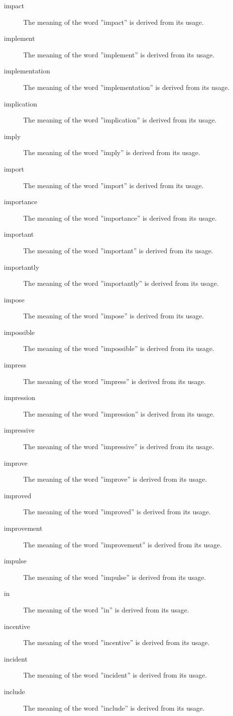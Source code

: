 \documentclass[12pt, letterpaper]{memoir}
\begin{document}
\begin{description}
\item[impact] The meaning of the word ''impact'' is derived from its usage.
\item[implement] The meaning of the word ''implement'' is derived from its usage.
\item[implementation] The meaning of the word ''implementation'' is derived from its usage.
\item[implication] The meaning of the word ''implication'' is derived from its usage.
\item[imply] The meaning of the word ''imply'' is derived from its usage.
\item[import] The meaning of the word ''import'' is derived from its usage.
\item[importance] The meaning of the word ''importance'' is derived from its usage.
\item[important] The meaning of the word ''important'' is derived from its usage.
\item[importantly] The meaning of the word ''importantly'' is derived from its usage.
\item[impose] The meaning of the word ''impose'' is derived from its usage.
\item[impossible] The meaning of the word ''impossible'' is derived from its usage.
\item[impress] The meaning of the word ''impress'' is derived from its usage.
\item[impression] The meaning of the word ''impression'' is derived from its usage.
\item[impressive] The meaning of the word ''impressive'' is derived from its usage.
\item[improve] The meaning of the word ''improve'' is derived from its usage.
\item[improved] The meaning of the word ''improved'' is derived from its usage.
\item[improvement] The meaning of the word ''improvement'' is derived from its usage.
\item[impulse] The meaning of the word ''impulse'' is derived from its usage.
\item[in] The meaning of the word ''in'' is derived from its usage.
\item[incentive] The meaning of the word ''incentive'' is derived from its usage.
\item[incident] The meaning of the word ''incident'' is derived from its usage.
\item[include] The meaning of the word ''include'' is derived from its usage.

\end{description}
\end{document}
